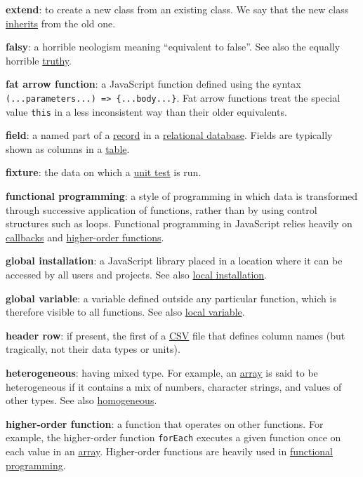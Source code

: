 \textbf{extend}: to create a new class from an existing class. We say
that the new class \protect\hyperlink{g:inherit}{inherits} from the old
one.

\textbf{falsy}: a horrible neologism meaning ``equivalent to false''.
See also the equally horrible \protect\hyperlink{g:truthy}{truthy}.

\textbf{fat arrow function}: a JavaScript function defined using the
syntax \texttt{(...parameters...)\ =\textgreater{}\ \{...body...\}}. Fat
arrow functions treat the special value \texttt{this} in a less
inconsistent way than their older equivalents.

\textbf{field}: a named part of a \protect\hyperlink{g:record}{record}
in a \protect\hyperlink{g:relational-database}{relational database}.
Fields are typically shown as columns in a
\protect\hyperlink{g:table}{table}.

\textbf{fixture}: the data on which a
\protect\hyperlink{g:unit-test}{unit test} is run.

\textbf{functional programming}: a style of programming in which data is
transformed through successive application of functions, rather than by
using control structures such as loops. Functional programming in
JavaScript relies heavily on
\protect\hyperlink{g:callback-function}{callbacks} and
\protect\hyperlink{g:higher-order-function}{higher-order functions}.

\textbf{global installation}: a JavaScript library placed in a location
where it can be accessed by all users and projects. See also
\protect\hyperlink{g:local-installation}{local installation}.

\textbf{global variable}: a variable defined outside any particular
function, which is therefore visible to all functions. See also
\protect\hyperlink{g:local-variable}{local variable}.

\textbf{header row}: if present, the first of a
\protect\hyperlink{g:csv}{CSV} file that defines column names (but
tragically, not their data types or units).

\textbf{heterogeneous}: having mixed type. For example, an
\protect\hyperlink{g:array}{array} is said to be heterogeneous if it
contains a mix of numbers, character strings, and values of other types.
See also \protect\hyperlink{g:homogeneous}{homogeneous}.

\textbf{higher-order function}: a function that operates on other
functions. For example, the higher-order function \texttt{forEach}
executes a given function once on each value in an
\protect\hyperlink{g:array}{array}. Higher-order functions are heavily
used in \protect\hyperlink{g:functional-programming}{functional
programming}.

